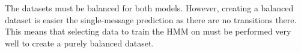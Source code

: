 The datasets must be balanced for both models. However, creating a balanced dataset is easier the single-message prediction as there are no transitions there. This means that selecting data to train the HMM on must be performed very well to create a purely balanced dataset.


\begin{comment}
To summarize: in order to predict emoticons in sequence of messages, the positivity, neutrality or negativity of each message must be determined. By preprocessing each message and extracting features, the "gist" of each message is extracted. This "gist" is used to train a first-order Hidden Markov Model, which can then be used to predict the emoticon of messages. However, in order to label the training data correctly, first all messages must be labelled. To do this, a perceptron is used. When training all of the models, it is imperative to select balanced data to train each model in order to achieve optimal prediction.
\end{comment}
